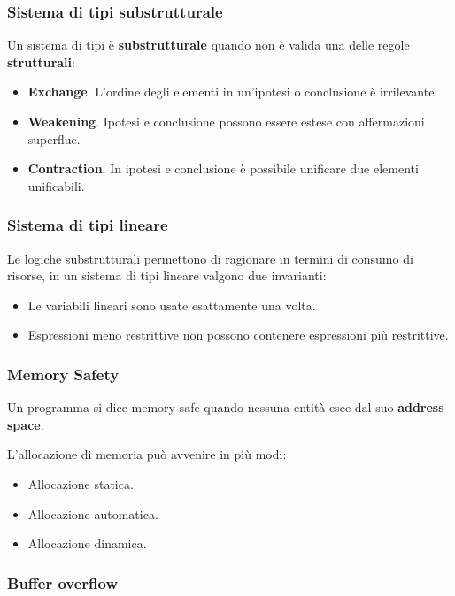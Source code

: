 \documentclass{beamer}
\begin{document}
\begin{frame}
    \frametitle{Sistema di tipi substrutturale}
    Un sistema di tipi è \textbf{substrutturale} quando non è valida una delle regole \textbf{strutturali}:
    \begin{itemize}
        \item \textbf{Exchange}. L'ordine degli elementi in un'ipotesi o conclusione è irrilevante. 
        \item \textbf{Weakening}. Ipotesi e conclusione possono essere estese con affermazioni superflue. 
        \item \textbf{Contraction}. In ipotesi e conclusione è possibile unificare due elementi unificabili. 
    \end{itemize} 
\end{frame}

\begin{frame}
    \frametitle{Sistema di tipi lineare}
    Le logiche substrutturali permettono di ragionare in termini di consumo di risorse, in un sistema di tipi lineare valgono due invarianti:
    \begin{itemize}
        \item Le variabili lineari sono usate esattamente una volta.
        \item Espressioni meno restrittive non possono contenere espressioni più restrittive.
    \end{itemize}
\end{frame}

\begin{frame}
    \frametitle{Memory Safety}
    Un programma si dice memory safe quando nessuna entità esce dal suo \textbf{address space}.
    
    L'allocazione di memoria può avvenire in più modi:
    \begin{itemize}
        \item Allocazione statica.
        \item Allocazione automatica.
        \item Allocazione dinamica.
    \end{itemize}    
\end{frame}

\begin{frame}
    \frametitle{Buffer overflow}
    
        
\end{frame}
\end{document}
